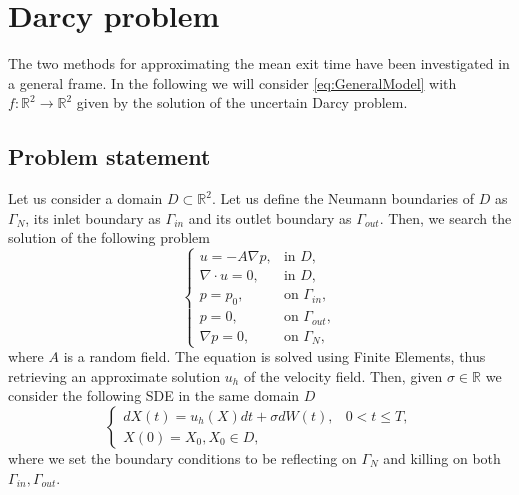 \section{Darcy problem}
The two methods for approximating the mean exit time have been investigated in a general frame. In the following we will consider \ref{eq:GeneralModel} with $f\colon \mathbb{R}^2 \rightarrow \mathbb{R}^2$ given by the solution of the uncertain Darcy problem. 

\subsection{Problem statement}
Let us consider a domain $D \subset \mathbb{R}^2$. Let us define the Neumann boundaries of $D$ as $\Gamma_N$, its inlet boundary as $\Gamma_{in}$ and its outlet boundary as $\Gamma_{out}$. Then, we search the solution of the following problem
\begin{equation}
	\label{eq:DarcyProblem}
	\begin{cases}
		u = -A \nabla p, & \text{in } D, \\
		\nabla\cdot u = 0, & \text{in } D, \\
		p = p_0, & \text{on } \Gamma_{in},\\
		p = 0, & \text{on } \Gamma_{out}, \\
		\nabla p = 0, & \text{on } \Gamma_N,
	\end{cases}
\end{equation}
where $A$ is a random field. The equation is solved using Finite Elements, thus retrieving an approximate solution $u_h$ of the velocity field. Then, given $\sigma \in \mathbb{R}$ we consider the following SDE in the same domain $D$
\begin{equation}
	\label{eq:GeneralDarcySDE}
	\begin{cases}
		dX(t) = u_h(X) dt + \sigma dW(t), & 0 < t \leq T, \\
		X(0) = X_0, X_0 \in D,
	\end{cases}
\end{equation}
where we set the boundary conditions to be reflecting on $\Gamma_N$ and killing on both $\Gamma_{in},\Gamma_{out}$.



